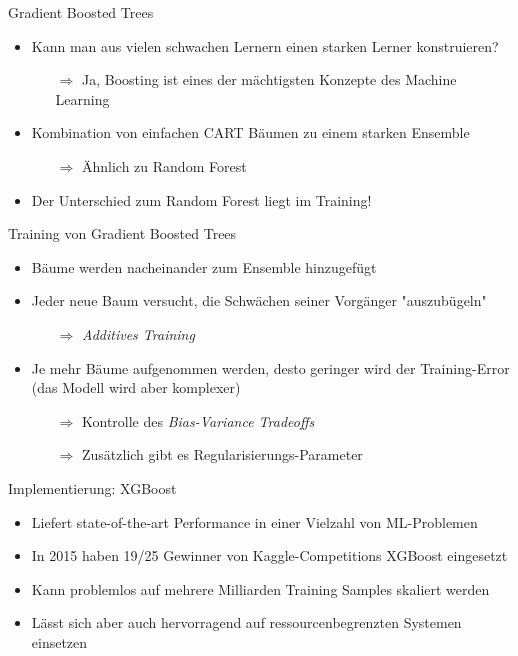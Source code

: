 \begin{frame}{Gradient Boosted Trees}
    \begin{itemize}
        \item Kann man aus vielen \glqq schwachen \grqq{} Lernern einen starken Lerner konstruieren?
            \begin{itemize}
                \item[$\Rightarrow$] Ja, Boosting ist eines der m\"achtigsten Konzepte des Machine Learning \cite{elements}
            \end{itemize}
        \item Kombination von einfachen CART B\"aumen zu einem starken Ensemble
            \begin{itemize}
                \item[$\Rightarrow$] \"Ahnlich zu Random Forest
            \end{itemize}
        \item Der Unterschied zum Random Forest liegt im Training!
    \end{itemize}
\end{frame}

\begin{frame}{Training von Gradient Boosted Trees}
    \begin{itemize}
        \item B\"aume werden nacheinander zum Ensemble hinzugef\"ugt
        \item Jeder neue Baum versucht, die Schw\"achen seiner Vorg\"anger "auszub\"ugeln"
            \begin{itemize}
                \item[$\Rightarrow$] \textit{Additives Training}
            \end{itemize}
        \item Je mehr B\"aume aufgenommen werden, desto geringer wird der Training-Error (das Modell wird aber komplexer)
            \begin{itemize}
                \item[$\Rightarrow$] Kontrolle des \textit{Bias-Variance Tradeoffs}
                \item[$\Rightarrow$] Zus\"atzlich gibt es Regularisierungs-Parameter
            \end{itemize}
    \end{itemize}
\end{frame}

\begin{frame}{Implementierung: XGBoost}
    \begin{itemize}
        \item Liefert state-of-the-art Performance in einer Vielzahl von ML-Problemen
        \item In 2015 haben 19/25 Gewinner von Kaggle-Competitions XGBoost eingesetzt
        \item Kann problemlos auf mehrere Milliarden Training Samples skaliert werden 
        \item L\"asst sich aber auch hervorragend auf ressourcenbegrenzten Systemen einsetzen \cite{XGBoost}
    \end{itemize}
\end{frame}